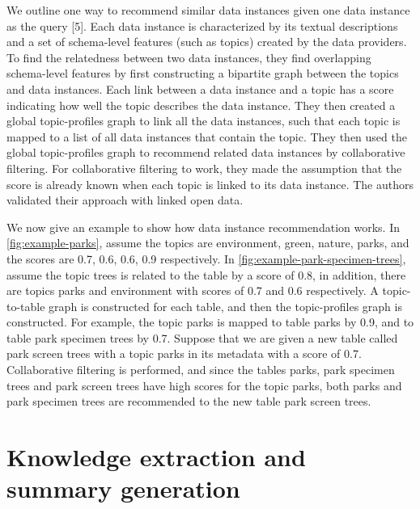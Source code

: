 We outline one way to recommend similar data instances given one data instance as the query \cite{conf/esws/EllefiBDT16}[5]. Each data instance is characterized by its textual descriptions and a set of schema-level features (such as topics) created by the data providers. To find the relatedness between two data instances, they find overlapping schema-level features by first constructing a bipartite graph between the topics and data instances. Each link between a data instance and a topic has a score indicating how well the topic describes the data instance. They then created a global topic-profiles graph to link all the data instances, such that each topic is mapped to a list of all data instances that contain the topic. They then used the global topic-profiles graph to recommend related data instances by collaborative filtering. For collaborative filtering to work, they made the assumption that the score is already known when each topic is linked to its data instance. The authors validated their approach with linked open data.

We now give an example to show how data instance recommendation works. In \autoref{fig:example-parks}, assume the topics are environment, green, nature, parks, and the scores are 0.7, 0.6, 0.6, 0.9 respectively. In \autoref{fig:example-park-specimen-trees}, assume the topic trees is related to the table by a score of 0.8, in addition, there are topics parks and environment with scores of 0.7 and 0.6 respectively. A topic-to-table graph is constructed for each table, and then the topic-profiles graph is constructed. For example, the topic parks is mapped to table parks by 0.9, and to table park specimen trees by 0.7. Suppose that we are given a new table called park screen trees with a topic parks in its metadata with a score of 0.7. Collaborative filtering is performed, and since the tables parks, park specimen trees and park screen trees have high scores for the topic parks, both parks and park specimen trees are recommended to the new table park screen trees.

\section{Knowledge extraction and summary generation}
\label{sec:KnowledgeExtractionAndSummaryGeneration}

